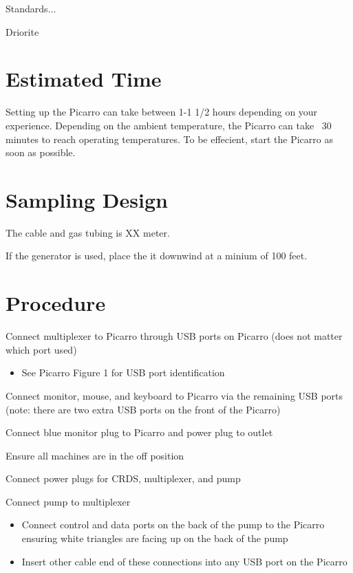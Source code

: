 \documentclass[12pt]{../SOP3}\usepackage[]{graphicx}\usepackage[]{color}
\begin{document}
\NP Standards..\cite{StandardMethods2012}.

\NP Driorite


\section{Estimated Time}

\NP Setting up the Picarro can take between 1-1 1/2 hours depending on your experience. Depending on the ambient temperature, the Picarro can take ~30 minutes to reach operating temperatures. To be effecient, start the Picarro as soon as possible.

\section{Sampling Design}

\NP The cable and gas tubing is XX meter.

\NP If the generator is used, place the it downwind at a minium of 100 feet.

\section{Procedure}

\NP Connect multiplexer to Picarro through USB ports on Picarro (does not matter which port used)
\begin{itemize}
\item See Picarro Figure 1 for USB port identification
\end{itemize}

\NP Connect monitor, mouse, and keyboard to Picarro via the remaining USB ports (note: there are two extra USB ports on the front of the Picarro)

\NP Connect blue monitor plug to Picarro and power plug to outlet

\NP Ensure all machines are in the off position

\NP Connect power plugs for CRDS, multiplexer, and pump

\NP Connect pump to multiplexer
\begin{itemize}
\item Connect control and data ports on the back of the pump to the Picarro ensuring white triangles are facing up on the back of the pump
\item Insert other cable end of these connections into any USB port on the Picarro
\end{itemize}
\end{document}

